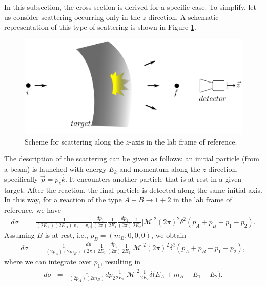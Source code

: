 \documentclass[11pt,showpacs,preprintnumbers,amsmath,amssymb,prd,nofootinbib,superscriptaddress]{revtex4-2}
\begin{document}
In this subsection, the cross section is derived for a specific case. To simplify, let us consider scattering occurring only in the $z$-direction. A schematic representation of this type of scattering is shown in Figure \ref{fig6}.
\begin{figure}[ht]
    \centering
    \includegraphics[width=0.5\linewidth]{scattering_scheme.png}
    \caption{Scheme for scattering along the $z$-axis in the lab frame of reference.}
    \label{fig6}
\end{figure}

The description of the scattering can be given as follows: an initial particle (from a beam) is launched with energy $E_k$ and momentum along the $z$-direction, specifically $\vec{p} = p_z \hat{k}$. It encounters another particle that is at rest in a given target. After the reaction, the final particle is detected along the same initial axis. In this way, for a reaction of the type $A + B \to 1 + 2$ in the lab frame of reference, we have
\begin{eqnarray}
    d\sigma &=&\frac{1}{(2E_A)(2E_B)|v_A-v_B|}\frac{dp_1}{(2\pi)}\frac{1}{2E_1}\frac{dp_2}{(2\pi)}\frac{1}{2E_2}|\mathcal{M}|^2(2\pi)^2\delta^2(p_A+p_B-p_1-p_2).
\end{eqnarray}
Assuming $B$ is at rest, i.e., $p_B = (m_B, 0, 0, 0)$, we obtain
\begin{eqnarray}
    d\sigma &=&\frac{1}{(2p_A)(2m_B)}\frac{dp_1}{(2\pi)}\frac{1}{2E_1}\frac{dp_2}{(2\pi)}\frac{1}{2E_2}|\mathcal{M}|^2(2\pi)^2\delta^2(p_A+p_B-p_1-p_2),
\end{eqnarray}
where we can integrate over $p_1$, resulting in
\begin{eqnarray}
    d\sigma&=&\frac{1}{(2p_A)(2m_B)}dp_2\frac{1}{2E_1}|\mathcal{M}|^2\frac{1}{2E_2}\delta\biggl(E_A+m_B-E_1-E_2\biggr).
\end{eqnarray}
\end{document}
